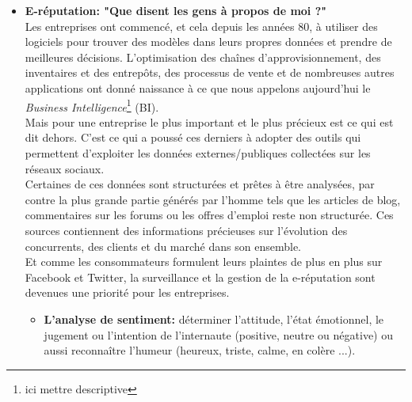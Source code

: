 \documentclass{report}
\begin{document}
\begin{itemize}
    \item \textbf{E-réputation: "Que disent les gens à propos de moi ?" }\\
    Les entreprises ont commencé, et cela depuis les années 80, à utiliser des logiciels pour trouver des modèles dans leurs propres données et prendre de meilleures décisions. L'optimisation des chaînes d'approvisionnement, des inventaires et des entrepôts, des processus de vente et de nombreuses autres applications ont donné naissance à ce que nous appelons aujourd'hui le \emph{Business Intelligence}\footnote{ici mettre descriptive} (BI).\\ 
    Mais pour une entreprise le plus important et le plus précieux est ce qui est dit dehors. C'est ce qui a poussé ces derniers à adopter des outils qui permettent d'exploiter les données externes/publiques collectées sur les réseaux sociaux.\\
    Certaines de ces données sont structurées et prêtes à être analysées, par contre la plus grande partie générés par l'homme tels que les articles de blog, commentaires sur les forums ou les offres d'emploi reste non structurée. Ces sources contiennent des informations précieuses sur l'évolution des concurrents, des clients et du marché dans son ensemble.\\
    Et comme les consommateurs formulent leurs plaintes de plus en plus sur Facebook et Twitter, la surveillance et la gestion de la e-réputation sont devenues une priorité pour les entreprises.
    \begin{itemize}
        \item \textbf{L'analyse de sentiment:} déterminer l'attitude, l'état émotionnel, le jugement ou l'intention de l'internaute (positive, neutre ou négative) ou aussi reconnaître l'humeur (heureux, triste, calme, en colère ...).\\
    \end{itemize}


\end{itemize}
\end{document}

